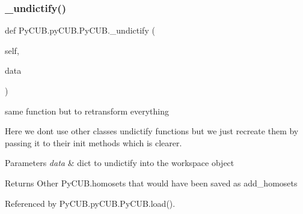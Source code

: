 \mbox{\label{class_py_c_u_b_1_1py_c_u_b_1_1_py_c_u_b_a8f60d259562234b7872cdc9cef03ce75}} 
\subsubsection{\texorpdfstring{\+\_\+undictify()}{\_undictify()}}
{\footnotesize\ttfamily def Py\+C\+U\+B.\+py\+C\+U\+B.\+Py\+C\+U\+B.\+\_\+undictify (\begin{DoxyParamCaption}\item[{}]{self,  }\item[{}]{data }\end{DoxyParamCaption})\hspace{0.3cm}{\ttfamily [private]}}



same function but to retransform everything 

Here we don\textquotesingle{}t use other classes undictify functions but we just recreate them by passing it to their init methods which is clearer.


\begin{DoxyParams}{Parameters}
{\em data} & dict to undictify into the workspace object\\
\hline
\end{DoxyParams}
\begin{DoxyReturn}{Returns}
Other Py\+C\+U\+B.\+homosets that would have been saved as add\+\_\+homosets 
\end{DoxyReturn}


Referenced by Py\+C\+U\+B.\+py\+C\+U\+B.\+Py\+C\+U\+B.\+load().

\mbox{\label{class_py_c_u_b_1_1py_c_u_b_1_1_py_c_u_b_ad350376cd68d4daacec78c694ed754c6}} 

